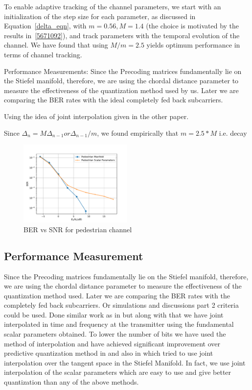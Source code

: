\documentclass[conference]{IEEEtran}
\begin{document}
To enable adaptive tracking of the channel parameters, we start with
an initialization of the step size for each parameter, as discussed in
Equation~\ref{delta_eqn}, with $m = 0.56, M = 1.4$ (the choice is
motivated by the results in~\ref{5671092}), and track parameters with
the temporal evolution of the channel. We have found that using
$M / m = 2.5$ yields optimum performance in terms of channel tracking.

Performance Measurements:
Since the Precoding matrices fundamentally lie on the Stiefel manifold, therefore, we are using the chordal distance parameter to measure the effectiveness of the quantization method used by us. Later we are comparing the BER rates with the ideal completely fed back subcarriers.

Using the idea of joint interpolation given in the other paper.

Since $\Delta_{n} = M\Delta_{n-1} or \Delta_{n-1}/m $, we found empirically that $m=2.5*M$ i.e. decay

\begin{figure}
\includegraphics[width=0.5\textwidth]{images/pedestrian.pdf}
\caption{BER vs SNR for pedestrian channel}
\label{ber_overview}
\vspace{-5pt}
\end{figure}

\subsection{Performance Measurement}

\label{setting}



\noindent Since the Precoding matrices fundamentally lie on the Stiefel manifold, therefore, we are using the chordal distance parameter to measure the effectiveness of the quantization method used. Later we are comparing the BER rates with the completely fed back subcarriers. Or simulations and discussions part 2 criteria could be used. Done similar work as in \cite{4114278} but along with that we have joint interpolated in time and frequency at the transmitter using the fundamental scalar parameters obtained. To lower the number of bits we have used the method of interpolation and have achieved significant improvement over predictive quantization method in \cite{6891198} and also in \cite{Gupt1905:Predictive} which tried to use joint interpolation over the tangent space in the Stiefel Manifold. In fact, we use joint interpolation of the scalar parameters which are easy to use and give better quantization than any of the above methods.
\end{document}
